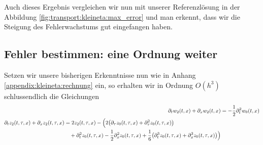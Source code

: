 Auch dieses Ergebnis vergleichen wir nun mit unserer Referenzlösung in der Abbildung \ref{fig:transport:kleineta:max_error} und man erkennt, dass wir die Steigung des Fehlerwachstums gut eingefangen haben.

\subsection*{Fehler bestimmen: eine Ordnung weiter}

Setzen wir unsere bisherigen Erkenntnisse nun wie in Anhang \ref{appendix:kleineta:rechnung} ein, so erhalten wir in Ordnung $O(h^3)$ schlussendlich die Gleichungen
\begin{align}
\partial_t w_2(t,x) + \partial_x w_2(t,x) &= - \frac{1}{2} \partial^2_t w_0(t,x)\\
\begin{split}
\partial_t z_2(t,\tau,x) + \partial_x z_2(t,\tau,x) &= 2 z_2(t,\tau,x) - \Bigl( 2 \bigl( \partial_\tau z_0(t,\tau,x) + \partial^2_\tau z_0(t,\tau,x) \bigr)\\
&\quad + \partial^2_t z_0(t,\tau,x) - \frac{1}{2} \partial^2_x z_0(t,\tau,x) + \frac{1}{6} \bigl(\partial^3_t z_0(t,\tau,x) + \partial^3_x z_0(t,\tau,x)\bigr) \Bigr)
\end{split}
\end{align}

